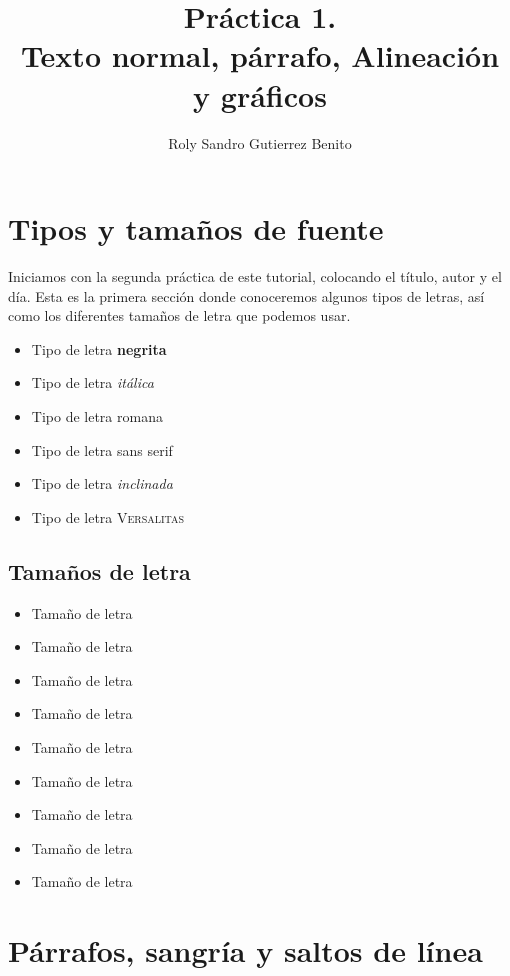 \documentclass[12pt]{article}
\begin{document}
\title{Práctica	1. \\ Texto normal, párrafo,
Alineación y gráficos}
\author{Roly Sandro Gutierrez Benito}
\maketitle
\tableofcontents

\section{Tipos y tamaños de fuente}
Iniciamos con la segunda práctica de este tutorial, 
colocando el título, autor y el día. Esta es la primera
sección donde conoceremos algunos tipos de letras, así
como los diferentes tamaños de letra que podemos usar.

\begin{itemize}
\item Tipo de letra \textbf{negrita}
\item Tipo de letra \textit{itálica}
\item Tipo de letra \textrm{romana}
\item Tipo de letra \textsf{sans serif}
\item Tipo de letra \textsl{inclinada}
\item Tipo de letra \textsc{Versalitas}
\end{itemize}

\newpage
\subsection{Tamaños de letra}
\begin{itemize}
\item {\tiny Tamaño} de letra
\item {\scriptsize Tamaño} de letra
\item {\footnotesize Tamaño} de letra
\item {\small Tamaño} de letra
\item {\normalsize Tamaño} de letra
\item {\large Tamaño} de letra
\item {\LARGE Tamaño} de letra
\item {\huge Tamaño} de letra
\item {\Huge Tamaño} de letra
\end{itemize}

\section{Párrafos, sangría y saltos de línea}
\end{document}
